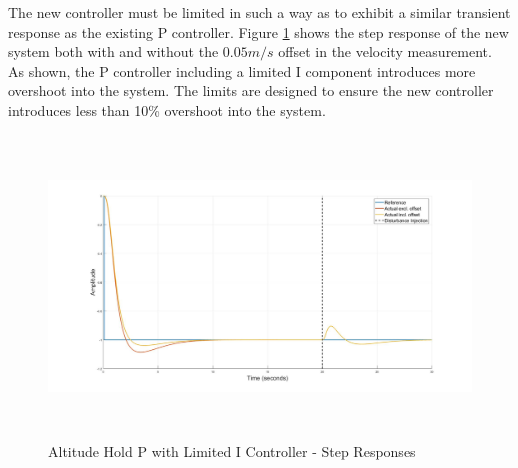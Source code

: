 \documentclass[12pt]{report}
\begin{document}
	The new controller must be limited in such a way as to exhibit a similar transient response as the existing P controller. Figure \ref{IM_AltHoldPIDistStep} shows the step response of the new system both with and without the $0.05m/s$ offset in the velocity measurement. As shown, the P controller including a limited I component introduces more overshoot into the system. The limits are designed to ensure the new controller introduces less than 10\% overshoot into the system. 
	
	\begin{figure}[H]
		\centering
		\includegraphics[height = 8cm]{../Design/Matlab/Controllers/altitude_step_pi.jpg}
		\caption{Altitude Hold P with Limited I Controller -  Step Responses}
		\label{IM_AltHoldPIDistStep}
	\end{figure}

		
	
\end{document}
